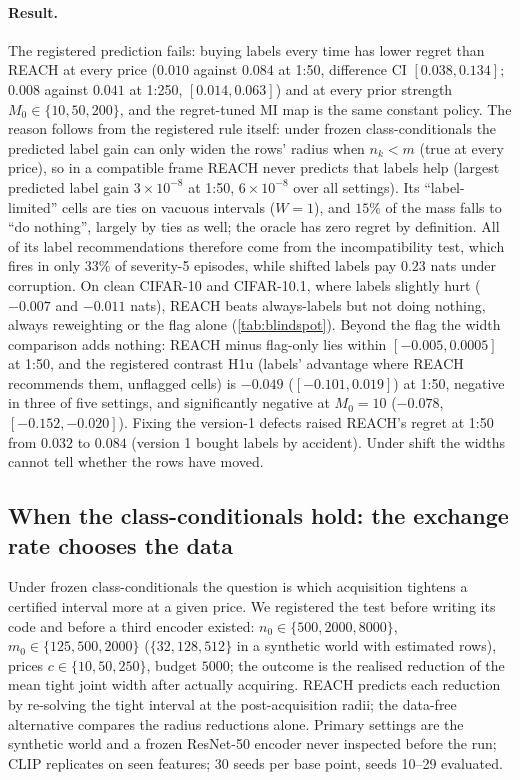 \documentclass[twoside]{article}
\begin{document}
\paragraph{Result.} The registered prediction fails: buying labels every time has lower regret than
REACH at every price ($0.010$ against $0.084$ at 1:50, difference CI $[0.038,0.134]$; $0.008$ against
$0.041$ at 1:250, $[0.014,0.063]$) and at every prior strength $M_0\in\{10,50,200\}$, and the regret-tuned
MI map is the same constant policy. The reason follows from the registered rule itself: under frozen
class-conditionals the predicted label gain can only widen the rows' radius when $n_k<m$ (true at every
price), so in a compatible frame REACH never predicts that labels help (largest predicted label gain $3\times10^{-8}$ at 1:50, $6\times10^{-8}$
over all settings). Its ``label-limited'' cells are ties on vacuous intervals ($W=1$), and $15\%$ of the
mass falls to ``do nothing'', largely by ties as well; the oracle has zero regret by definition. All of its
label recommendations therefore come from the incompatibility test, which fires in only $33\%$ of
severity-5 episodes, while shifted labels pay $0.23$ nats under corruption. On clean CIFAR-10 and
CIFAR-10.1, where labels slightly hurt ($-0.007$ and $-0.011$ nats), REACH beats always-labels but not
doing nothing, always reweighting or the flag alone (\cref{tab:blindspot}). Beyond the flag the width
comparison adds nothing: REACH minus flag-only lies within $[-0.005,0.0005]$ at 1:50, and the registered
contrast H1u (labels' advantage where REACH recommends them, unflagged cells) is $-0.049$
($[-0.101,0.019]$) at 1:50, negative in three of five settings, and significantly negative at $M_0=10$
($-0.078$, $[-0.152,-0.020]$). Fixing the version-1 defects raised
REACH's regret at 1:50 from $0.032$ to $0.084$ (version 1 bought labels by accident). Under shift the
widths cannot tell whether the rows have moved.

\subsection{When the class-conditionals hold: the exchange rate chooses the data}
\label{sec:exp-exchange}

Under frozen class-conditionals the question is which acquisition tightens a certified interval more
at a given price. We registered the test before writing its code and before a third encoder existed:
$n_0\in\{500,2000,8000\}$, $m_0\in\{125,500,2000\}$ ($\{32,128,512\}$ in a synthetic world with estimated
rows), prices $c\in\{10,50,250\}$, budget $5000$; the outcome is the realised reduction of the mean tight
joint width after actually acquiring. REACH predicts each reduction by re-solving the tight interval at
the post-acquisition radii; the data-free alternative compares the radius reductions alone. Primary
settings are the synthetic world and a frozen ResNet-50 encoder \citep{he2016deep} never inspected
before the run; CLIP
replicates on seen features; 30 seeds per base point, seeds 10--29 evaluated.
\end{document}
